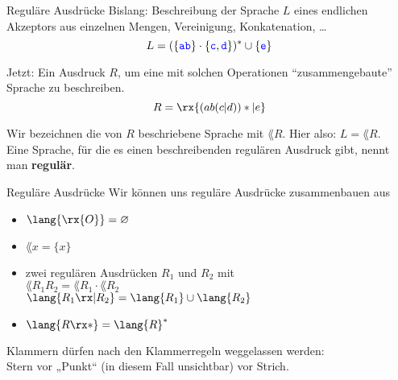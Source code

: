 \begin{frame}{Reguläre Ausdrücke} 
	Bislang: Beschreibung der Sprache $L$ eines endlichen Akzeptors aus einzelnen Mengen, Vereinigung, Konkatenation, \dots \\
	$$ L = (\left\{\hbox{\textcolor{blue}{\texttt{ab}}}\right\} \cdot \left\{\hbox{\textcolor{blue}{\texttt{c}}}, \hbox{\textcolor{blue}{\texttt{d}}}\right\})^\ast \cup \left\{\hbox{\textcolor{blue}{\texttt{e}}}\right\}$$
	\medskip \pause
	
	Jetzt: Ein Ausdruck $R$, um eine mit solchen Operationen \enquote{zusammengebaute} Sprache zu beschreiben.\\
	$$ R = \rx{(ab(c|d))*|e}$$
	
	Wir bezeichnen die von $R$ beschriebene Sprache mit $\lang{R}$. \: Hier also: $L = \lang{R}$.\\
	Eine Sprache, für die es einen beschreibenden regulären Ausdruck gibt, nennt man \textbf{regulär}.
\end{frame}

\begin{frame}{Reguläre Ausdrücke}
	Wir können uns reguläre Ausdrücke zusammenbauen aus
	\begin{itemize}
		\item {} $\lang{\rx{O}} = \emptyset$\pause
		\item {}  $\lang{x}=\{x\}$ \pause
		\item zwei regulären Ausdrücken $R_1$ und $R_2$ mit\\ 
			 $\lang{R_1 R_2} = \lang{R_1} \cdot \lang{R_2}$\\
			 $\lang{R_1 \rx| R_2} = \lang{R_1} \cup \lang{R_2}$ \pause
		\item {} $\lang{R\rx*} = \lang{R}^*$\pause
	\end{itemize} 
	Klammern dürfen nach den Klammerregeln weggelassen werden:\\
	Stern vor „Punkt“ {\small (in diesem Fall unsichtbar)} vor Strich.
\end{frame}

